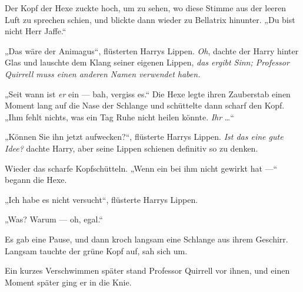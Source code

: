 Der Kopf der Hexe zuckte hoch, um zu sehen, wo diese Stimme aus der leeren Luft zu sprechen schien, und blickte dann wieder zu Bellatrix hinunter.
„Du bist nicht Herr Jaffe.“

„Das wäre der Animagus“, flüsterten Harrys Lippen. \emph{Oh}, dachte der Harry hinter Glas und lauschte dem Klang seiner eigenen Lippen, \emph{das ergibt Sinn; Professor Quirrell muss einen anderen Namen verwendet haben.}

„Seit wann ist \emph{er} ein — bah, vergiss es.“ Die Hexe legte ihren Zauberstab einen Moment lang auf die Nase der Schlange und schüttelte dann scharf den Kopf.
„Ihm fehlt nichts, was ein Tag Ruhe nicht heilen könnte. \emph{Ihr} …“

„Können Sie ihn jetzt aufwecken?“, flüsterte Harrys Lippen. \emph{Ist das eine gute Idee?} dachte Harry, aber seine Lippen schienen definitiv so zu denken.

Wieder das scharfe Kopfschütteln.
„Wenn ein  bei ihm nicht gewirkt hat —“ begann die Hexe.

„Ich habe es nicht versucht“, flüsterte Harrys Lippen.

„Was? Warum — oh, egal.“ 

Es gab eine Pause, und dann kroch langsam eine Schlange aus ihrem Geschirr. Langsam tauchte der grüne Kopf auf, sah sich um.

Ein kurzes Verschwimmen später stand Professor Quirrell vor ihnen, und einen Moment später ging er in die Knie.

